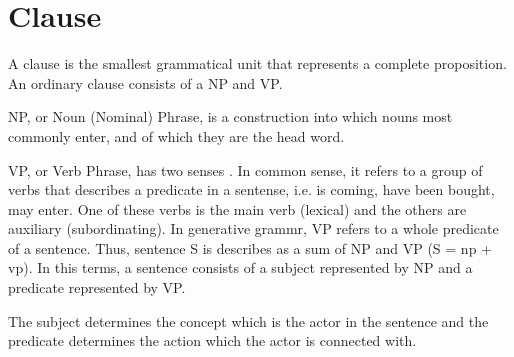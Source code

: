 \section{Clause}

A clause is the smallest grammatical unit that represents a complete proposition. An ordinary clause consists of a NP and VP.


NP, or Noun (Nominal) Phrase, is a construction into which nouns most commonly enter, and of which they are the head word. \cite{lang-dict}

VP, or Verb Phrase, has two senses \cite{lang-dict}. In common sense, it refers to a group of verbs that describes a predicate in a sentense, i.e. is coming, have been bought, may enter. One of these verbs is the main verb (lexical) and the others are auxiliary (subordinating). In generative grammr, VP refers to a whole predicate of a sentence. Thus, sentence S is describes as a sum of NP and VP (S = \gls{np} + \gls{vp}). In this terms, a sentence consists of a subject represented by NP and a predicate represented by VP.

The subject determines the concept which is the actor in the sentence and the predicate determines the action which the actor is connected with.



